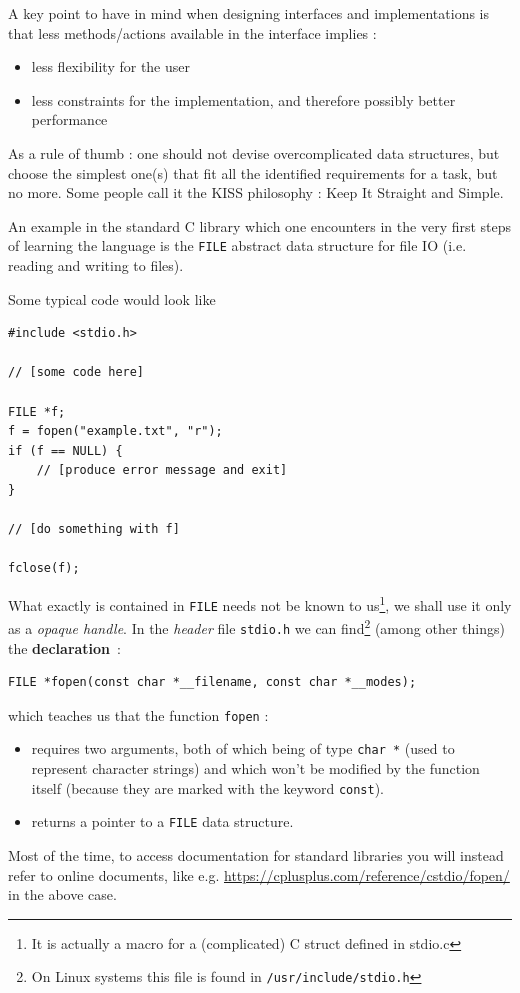 \documentclass[12pt]{article}
\theoremstyle{plain}
\theoremstyle{remark}
\begin{document}
\medskip

A key point to have in mind when designing interfaces and implementations is
that less methods/actions available in the interface implies :
\begin{itemize}
	\item less flexibility for the user
	\item less constraints for the implementation, and therefore possibly
		better performance
\end{itemize}
As a rule of thumb : one should not devise overcomplicated data structures, but
choose the simplest one(s) that fit all the identified requirements for a task,
but no more. Some people call it the KISS philosophy : Keep It Straight and
Simple.

\medskip

An example in the standard C library which one encounters in the very first
steps of learning the language is the {\tt FILE} abstract data structure
for file IO (i.e. reading and writing to files).

Some typical code would look like

\begin{lstlisting}[style=C]
#include <stdio.h>

// [some code here]

FILE *f;  
f = fopen("example.txt", "r");
if (f == NULL) {
	// [produce error message and exit]
}

// [do something with f]

fclose(f);
\end{lstlisting}

What exactly is contained in {\tt FILE} needs not be known to us\footnote{It is actually
a macro for a (complicated) C struct defined in stdio.c}, we shall use it only as
a {\it opaque handle}. In the {\it header} file {\tt stdio.h} we can
find\footnote{On Linux systems this file is found in {\tt /usr/include/stdio.h}} 
(among other things) the {\bf declaration}~:
\begin{lstlisting}[style=C]
FILE *fopen(const char *__filename, const char *__modes);
\end{lstlisting}
which teaches us that the function {\tt fopen} :
\begin{itemize}
	\item requires two arguments, both of which being of type 
		{\tt char *} (used to represent character strings) and 
		which won't be modified by the function itself (because they 
		are marked with the keyword {\tt const}).
	\item returns a pointer to a {\tt FILE} data structure.
\end{itemize}
Most of the time, to access documentation for standard libraries you will
instead refer to online documents, like e.g. 
\url{https://cplusplus.com/reference/cstdio/fopen/} in the above case.
\end{document}
